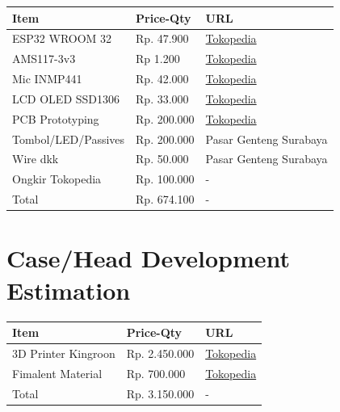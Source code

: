 \documentclass[a4paper,12pt,oneside,pdflatex,italian,final,twocolumn]{article}
\begin{document}
	\begin{tabular}{|l|l|l|}
		\toprule
		Item & Price-Qty & URL \\
		\midrule
		ESP32 WROOM 32 & Rp. 47.900 & \href{https://www.tokopedia.com/altrosurabaya/esp-wroom-32-esp32-wifi-bt-ble-mcu-module-only-smd-smt}{Tokopedia} \\
		AMS117-3v3 & Rp 1.200 & \href{https://www.tokopedia.com/radioshop/ams117-ams117-3-3v-ams117-3v3-ams117-3-3-smd-regulator-chipset}{Tokopedia} \\
		Mic INMP441 & Rp. 42.000 & \href{https://www.tokopedia.com/easyware-id/inmp441-omnidirectional-microphone-module-mems-i2s-interface}{Tokopedia} \\
		LCD OLED SSD1306 & Rp. 33.000 & \href{https://www.tokopedia.com/easyware-id/oled-128x64-lcd-i2c-spi-0-96-inch-white-blue-yellow-blue-backlight-i2c-yellow-blue}{Tokopedia} \\
		PCB Prototyping & Rp. 200.000 & \href{https://www.tokopedia.com/geraicerdas/cetak-pcb-1-keping-single-double-layer-rapid-prototyping-satuan}{Tokopedia} \\
		Tombol/LED/Passives & Rp. 200.000 & Pasar Genteng Surabaya \\
		Wire dkk & Rp. 50.000 & Pasar Genteng Surabaya \\
		Ongkir Tokopedia & Rp. 100.000 & - \\
		\midrule
		Total & Rp. 674.100  & - \\
		\bottomrule
	\end{tabular}

	\section{Case/Head Development Estimation}
	
	\begin{tabular}{|l|l|l|}
		\toprule
		Item & Price-Qty & URL \\
		\midrule
		3D Printer Kingroon & Rp. 2.450.000 & \href{https://www.tokopedia.com/3dzaiku/3d-printer-kingroon-kp3s-new-linear-rail-direct-drive-32-bit-tmc2225}{Tokopedia} \\
		Fimalent Material & Rp. 700.000 & \href{https://www.tokopedia.com/3dzaiku/esun-3d-filament-terbaru-silk-pla-1-75-mm}{Tokopedia} \\
		\midrule
		Total & Rp. 3.150.000  & - \\
		\bottomrule
	\end{tabular}
\end{document}
